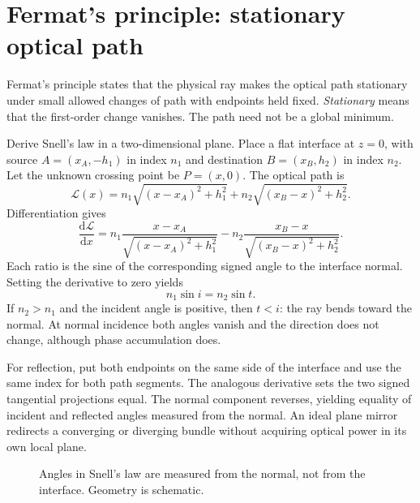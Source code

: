 \section{Fermat's principle: stationary optical path}
Fermat's principle states that the physical ray makes the optical path stationary under small allowed changes of path with endpoints held fixed. \emph{Stationary} means that the first-order change vanishes. The path need not be a global minimum.

Derive Snell's law in a two-dimensional plane. Place a flat interface at $z=0$, with source $A=(x_A,-h_1)$ in index $n_1$ and destination $B=(x_B,h_2)$ in index $n_2$. Let the unknown crossing point be $P=(x,0)$. The optical path is
\[
\mathcal{L}(x)=n_1\sqrt{(x-x_A)^2+h_1^2}
+n_2\sqrt{(x_B-x)^2+h_2^2}.
\]
Differentiation gives
\[
\frac{\mathrm{d}\mathcal{L}}{\mathrm{d}x}
=n_1\frac{x-x_A}{\sqrt{(x-x_A)^2+h_1^2}}
-n_2\frac{x_B-x}{\sqrt{(x_B-x)^2+h_2^2}}.
\]
Each ratio is the sine of the corresponding signed angle to the interface normal. Setting the derivative to zero yields
\begin{equation}
n_1\sin i=n_2\sin t.
\label{fnd:snell}
\end{equation}
If $n_2>n_1$ and the incident angle is positive, then $t<i$: the ray bends toward the normal. At normal incidence both angles vanish and the direction does not change, although phase accumulation does.

For reflection, put both endpoints on the same side of the interface and use the same index for both path segments. The analogous derivative sets the two signed tangential projections equal. The normal component reverses, yielding equality of incident and reflected angles measured from the normal. An ideal plane mirror redirects a converging or diverging bundle without acquiring optical power in its own local plane.

\begin{figure}[htbp]
\centering
{}
\caption{Angles in Snell's law are measured from the normal, not from the interface. Geometry is schematic.}
\end{figure}


